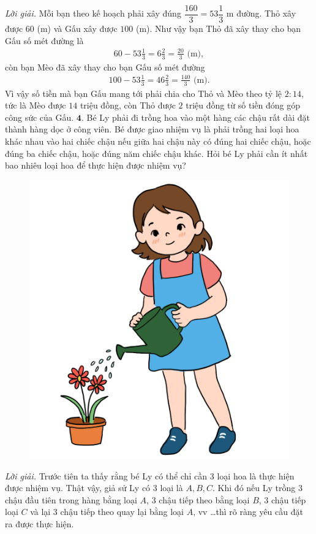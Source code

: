 \begin{multicols}{2}
\begin{figure}[H]
		\vspace*{-15pt}
	\end{figure}
	\textit{Lời giải.} 	Mỗi bạn theo kế hoạch phải xây đúng $\dfrac{160}{3} = 53\dfrac{1}{3}$  m đường. Thỏ xây được $60$ (m) và Gấu xây được $100$ (m). Như vậy bạn Thỏ đã xây thay cho bạn Gấu số mét đường là
	\begin{align*}
		60 - 53 \frac{1}{3} = 6 \frac{2}{3}= \frac{20}{3} \text{ (m)},
	\end{align*}
	còn bạn Mèo đã xây thay cho bạn Gấu số mét đường
	\begin{align*}
		100- 53 \frac{1}{3} = 46 \frac{2}{3}=\frac{140}{3} \text{ (m).}
	\end{align*}
	Vì vậy số tiền mà bạn Gấu mang tới phải chia cho Thỏ và Mèo theo tỷ lệ $2: 14$, tức là Mèo được $14$ triệu đồng, còn Thỏ được $2$ triệu đồng từ số tiền đóng góp công sức của Gấu.
	\vskip 0.1cm
	$\pmb{4.}$ Bé Ly phải đi trồng hoa vào một hàng các chậu rất dài đặt thành hàng dọc ở công viên. Bé được giao nhiệm vụ là phải trồng hai loại hoa khác nhau vào hai chiếc chậu nếu giữa hai chậu này có đúng hai chiếc chậu, hoặc đúng ba chiếc chậu, hoặc đúng năm chiếc chậu khác. Hỏi bé Ly phải cần ít nhất bao nhiêu loại hoa để thực hiện được nhiệm vụ?
	\begin{figure}[H]
		\centering
		\vspace*{-5pt}
		\captionsetup{labelformat= empty, justification=centering}
		\includegraphics[width=0.45\linewidth]{Pi7_bai4}
		\vspace*{-10pt}
	\end{figure}
	\textit{Lời giải.} Trước tiên ta thấy rằng bé Ly có thể chỉ cần $3$ loại hoa là thực hiện được nhiệm vụ. Thật vậy, giả sử Ly có $3$ loại là $A, B, C$. Khi đó nếu Ly trồng $3$ chậu đầu tiên trong hàng bằng loại $A$, $3$ chậu tiếp theo bằng loại $B$, $3$ chậu tiếp loại $C$ và lại $3$ chậu tiếp theo quay lại bằng loại $A$, vv \ldots thì rõ ràng yêu cầu đặt ra được thực hiện. 

\end{multicols}
